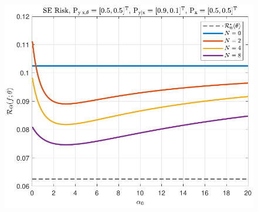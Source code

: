 \documentclass[aspectratio=169,usenames,dvipsnames]{beamer}
\DeclareMathOperator{\nbarrm}{\bar{\mathrm{n}}}
\begin{document}
\begin{frame}
\begin{columns}[c]
\begin{column}{0.45\linewidth}
\begin{figure}
\centering
\includegraphics[width=1\linewidth]{Risk_cond_SE_Dir_a0_leg_N_biased.pdf}
\end{figure}

\end{column}

\end{columns}

\centering
{}

\end{frame}




%
%
%
%
%
\end{document}
